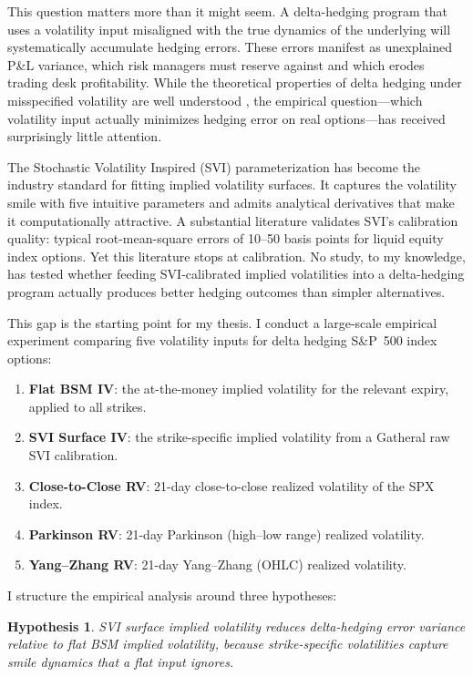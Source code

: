 \documentclass[12pt, letterpaper]{article}
\newtheorem{hypothesis}{Hypothesis}
\begin{document}
This question matters more than it might seem. A delta-hedging program that uses a volatility input misaligned with the true dynamics of the underlying will systematically accumulate hedging errors. These errors manifest as unexplained P\&L variance, which risk managers must reserve against and which erodes trading desk profitability. While the theoretical properties of delta hedging under misspecified volatility are well understood \citep{ElKaroui1998}, the empirical question---which volatility input actually minimizes hedging error on real options---has received surprisingly little attention.

The Stochastic Volatility Inspired (SVI) parameterization \citep{Gatheral2004, Gatheral2014} has become the industry standard for fitting implied volatility surfaces. It captures the volatility smile with five intuitive parameters and admits analytical derivatives that make it computationally attractive. A substantial literature validates SVI's calibration quality: typical root-mean-square errors of 10--50 basis points for liquid equity index options. Yet this literature stops at calibration. No study, to my knowledge, has tested whether feeding SVI-calibrated implied volatilities into a delta-hedging program actually produces better hedging outcomes than simpler alternatives.

This gap is the starting point for my thesis. I conduct a large-scale empirical experiment comparing five volatility inputs for delta hedging S\&P~500 index options:

\begin{enumerate}[label=(\arabic*)]
    \item \textbf{Flat BSM IV}: the at-the-money implied volatility for the relevant expiry, applied to all strikes.
    \item \textbf{SVI Surface IV}: the strike-specific implied volatility from a Gatheral raw SVI calibration.
    \item \textbf{Close-to-Close RV}: 21-day close-to-close realized volatility of the SPX index.
    \item \textbf{Parkinson RV}: 21-day Parkinson (high--low range) realized volatility.
    \item \textbf{Yang--Zhang RV}: 21-day Yang--Zhang (OHLC) realized volatility.
\end{enumerate}

I structure the empirical analysis around three hypotheses:

\begin{hypothesis}
\label{hyp:svi}
SVI surface implied volatility reduces delta-hedging error variance relative to flat BSM implied volatility, because strike-specific volatilities capture smile dynamics that a flat input ignores.
\end{hypothesis}
\end{document}

